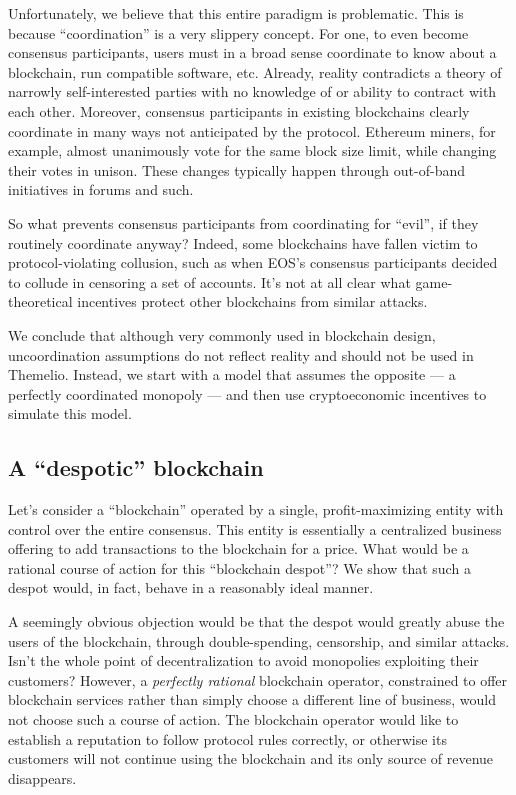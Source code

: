 \documentclass[letterpaper,12pt,oneside]{article}
\begin{document}
Unfortunately, we believe that this entire paradigm is problematic. This is because ``coordination'' is a very slippery concept. For one, to even become consensus participants, users must in a broad sense coordinate to know about a blockchain, run compatible software, etc. Already, reality contradicts a theory of narrowly self-interested parties with no knowledge of or ability to contract with each other. Moreover, consensus participants in existing blockchains clearly coordinate in many ways not anticipated by the protocol. Ethereum miners, for example, almost unanimously vote for the same block size limit, while changing their votes in unison. These changes typically happen through out-of-band initiatives in forums and such.

So what prevents consensus participants from coordinating for ``evil'', if they routinely coordinate anyway? Indeed, some blockchains have fallen victim to protocol-violating collusion, such as when EOS's consensus participants decided to collude in censoring a set of accounts. It's not at all clear what game-theoretical incentives protect other blockchains from similar attacks.

We conclude that although very commonly used in blockchain design, uncoordination assumptions do not reflect reality and should not be used in Themelio. Instead, we start with a model that assumes the opposite --- a perfectly coordinated monopoly --- and then use cryptoeconomic incentives to simulate this model.

\subsection{A ``despotic'' blockchain}

Let's consider a ``blockchain'' operated by a single, profit-maximizing entity with control over the entire consensus. This entity is essentially a centralized business offering to add transactions to the blockchain for a price. What would be a rational course of action for this ``blockchain despot''? We show that such a despot would, in fact, behave in a reasonably ideal manner.

A seemingly obvious objection would be that the despot would greatly abuse the users of the blockchain, through double-spending, censorship, and similar attacks. Isn't the whole point of decentralization to avoid monopolies exploiting their customers? However, a \emph{perfectly rational} blockchain operator, constrained to offer blockchain services rather than simply choose a different line of business, would not choose such a course of action. The blockchain operator would like to establish a reputation to follow protocol rules correctly, or otherwise its customers will not continue using the blockchain and its only source of revenue disappears.
\end{document}
